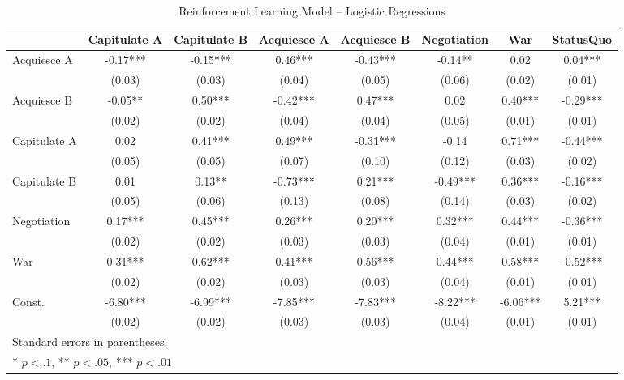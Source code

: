 \begin{landscape}
\begin{table}
	\begin{center}
		\caption{Reinforcement Learning Model -- Logistic Regressions}
		\label{table:rl_regressions}
	\begin{tabular}{lccccccc}
	\hline
	             & Capitulate A & Capitulate B & Acquiesce A & Acquiesce B & Negotiation & War      & StatusQuo   \\
	\hline
	Acquiesce A  & -0.17***     & -0.15***     & 0.46***     & -0.43***    & -0.14**     & 0.02     & 0.04***     \\
	             & (0.03)       & (0.03)       & (0.04)      & (0.05)      & (0.06)      & (0.02)   & (0.01)      \\
	Acquiesce B  & -0.05**      & 0.50***      & -0.42***    & 0.47***     & 0.02        & 0.40***  & -0.29***    \\
	             & (0.02)       & (0.02)       & (0.04)      & (0.04)      & (0.05)      & (0.01)   & (0.01)      \\
	Capitulate A & 0.02         & 0.41***      & 0.49***     & -0.31***    & -0.14       & 0.71***  & -0.44***    \\
	             & (0.05)       & (0.05)       & (0.07)      & (0.10)      & (0.12)      & (0.03)   & (0.02)      \\
	Capitulate B & 0.01         & 0.13**       & -0.73***    & 0.21***     & -0.49***    & 0.36***  & -0.16***    \\
	             & (0.05)       & (0.06)       & (0.13)      & (0.08)      & (0.14)      & (0.03)   & (0.02)      \\
	Negotiation  & 0.17***      & 0.45***      & 0.26***     & 0.20***     & 0.32***     & 0.44***  & -0.36***    \\
	             & (0.02)       & (0.02)       & (0.03)      & (0.03)      & (0.04)      & (0.01)   & (0.01)      \\
	War          & 0.31***      & 0.62***      & 0.41***     & 0.56***     & 0.44***     & 0.58***  & -0.52***    \\
	             & (0.02)       & (0.02)       & (0.03)      & (0.03)      & (0.04)      & (0.01)   & (0.01)      \\
	Const.       & -6.80***     & -6.99***     & -7.85***    & -7.83***    & -8.22***    & -6.06*** & 5.21***     \\
	             & (0.02)       & (0.02)       & (0.03)      & (0.03)      & (0.04)      & (0.01)   & (0.01)      \\
	\hline
	\hline
	\multicolumn{8}{l}{Standard errors in parentheses.} \\
	\multicolumn{8}{l}{* $p<.1$, ** $p<.05$, *** $p<.01$} \\
	\end{tabular}
	\end{center}
	\tableSpace
\end{table}


\end{landscape}
